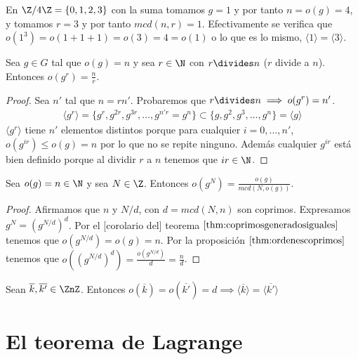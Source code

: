 \begin{ej}
	En $\Z/4\Z = \{0, 1, 2, 3\}$ con la suma tomamos $g = 1$ y por tanto $n = o(g) = 4$, y tomamos $r = 3$ y por tanto $mcd(n, r) = 1$. Efectivamente se verifica que $o(1^3) = o(1+1+1) = o(3) = 4 = o(1)$ o lo que es lo mismo, $\langle 1 \rangle = \langle 3 \rangle$.
\end{ej}

\begin{pro}
	\label{thm:ordenescoprimos}
	Sea $g \in G$ tal que $o(g) = n$ y sea $r \in \N$ con $r \divides n$ ($r$ divide a $n$). Entonces $o(g^r) = \frac{n}{r}$.
\end{pro}

\begin{proof}
	Sea $n'$ tal que $n = rn'$. Probaremos que $r\divides n \implies o(g^r) = n'$.
	\begin{align*}
		\langle g^r \rangle = \{g^r, g^{2r}, g^{3r}, \dots, g^{n'r} = g^n\} \subset \{g, g^2, g^3, \dots, g^n\} = \langle g \rangle
	\end{align*}
	$\langle g^r \rangle$ tiene $n'$ elementos distintos porque para cualquier $i = 0,\dots, n'$, $o(g^{ir}) \leq o(g) = n$ por lo que no se repite ninguno. Además cualquier $g^{ir}$ está bien definido porque al dividir $r$ a $n$ tenemos que $ir \in \N$.
\end{proof}

\begin{thm}
	\label{thm:ordendepotencia}
	Sea $o(g) = n \in \N$ y sea $N \in \Z$. Entonces $o(g^N) = \frac{o(g)}{mcd(N, o(g))}$.
\end{thm}

\begin{proof}
	Afirmamos que $n$ y $N/d$, con $d = mcd(N,n)$ son coprimos. Expresamos $g^N = (g^{N/d})^d$. Por el [corolario del] teorema $\ref{thm:coprimosgeneradosiguales}$ tenemos que $o(g^{N/d}) = o(g) = n$. Por la proposición $\ref{thm:ordenescoprimos}$ tenemos que $o((g^{N/d})^d) = \frac{o(g^{N/d})}{d} = \frac{n}{d}$.
\end{proof}

\begin{thm}
	Sean $\overline{k}, \overline{k'} \in \ZnZ$. Entonces $o(\overline{k}) = o(\overline{k'}) = d \implies \langle \overline{k} \rangle = \langle \overline{k'} \rangle$ 
\end{thm}

\section{El teorema de Lagrange}

